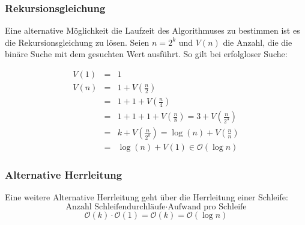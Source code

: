 \subsubsection{Rekursionsgleichung}
Eine alternative Möglichkeit die Laufzeit des Algorithmuses zu bestimmen ist es die Rekursionsgleichung zu lösen.
Seien \(n=2^{k}\) und \(V(n)\) die Anzahl, die die binäre Suche mit dem gesuchten Wert ausführt.
So gilt bei erfolgloser Suche:

\begin{eqnarray*}
	V(1) &=& 1 \\
	V(n) &=& 1+ V(\frac{n}{2}) \\
	&=& 1+1+V(\frac{n}{4}) \\
	&=& 1+1+1+V(\frac{n}{8}) = 3 +V(\frac{n}{2^{3}}) \\
	&=& k+V(\frac{n}{2^{k}}) = \log(n) + V(\frac{n}{n})\\
	&=& \log(n) + V(1) \in \mathcal{O}(\log n)
\end{eqnarray*}

\subsubsection{Alternative Herrleitung}
Eine weitere Alternative Herrleitung geht über die Herrleitung einer Schleife:
\[ \textrm{Anzahl Schleifendurchläufe} \cdot \textrm{Aufwand pro Schleife} \]
\[ \mathcal{O}(k) \cdot \mathcal{O}(1) = \mathcal{O}(k) = \mathcal{O}(\log n) \]

